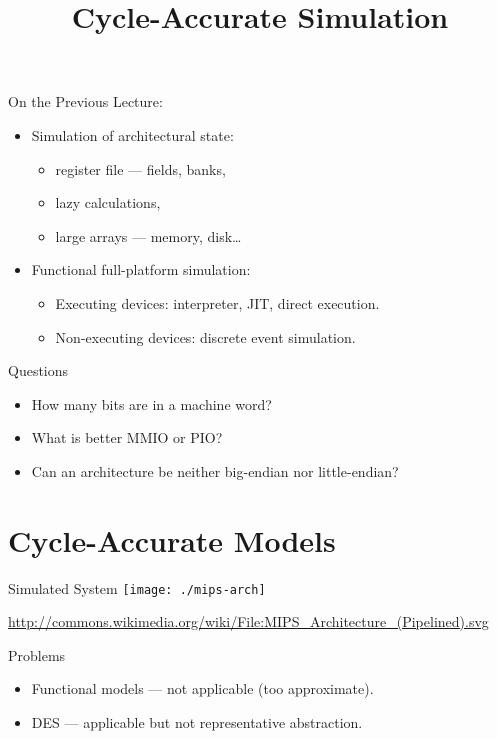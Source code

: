
\title{Cycle-Accurate Simulation}



\startslides

\begin{frame}{On the Previous Lecture:}
\begin{itemize}
\item Simulation of architectural state:
  \begin{itemize}
  \item register file --- fields, banks,
  \item lazy calculations,
  \item large arrays --- memory, disk\dots
  \end{itemize}
\item Functional full-platform simulation:
  \begin{itemize}
  \item Executing devices: interpreter, JIT, direct execution.
  \item Non-executing devices: discrete event simulation.
  \end{itemize}
\end{itemize}
\end{frame}

\begin{frame}{Questions}
\begin{itemize}
\item How many bits are in a machine word?\pause
\item What is better MMIO or PIO?\pause
\item Can an architecture be neither big-endian nor little-endian?\pause
\end{itemize}
\end{frame}

\section{Cycle-Accurate Models}

\begin{frame}{Simulated System}
\centering
\texttt{[image: ./mips-arch]}

\tiny{\url{http://commons.wikimedia.org/wiki/File:MIPS_Architecture_(Pipelined).svg}}
\end{frame}

\begin{frame}{Problems}
\begin{itemize}
\item Functional models --- not applicable (too approximate).
\item DES --- applicable but not representative abstraction.
\end{itemize}
\vfill
\centering
{}
\end{frame}

